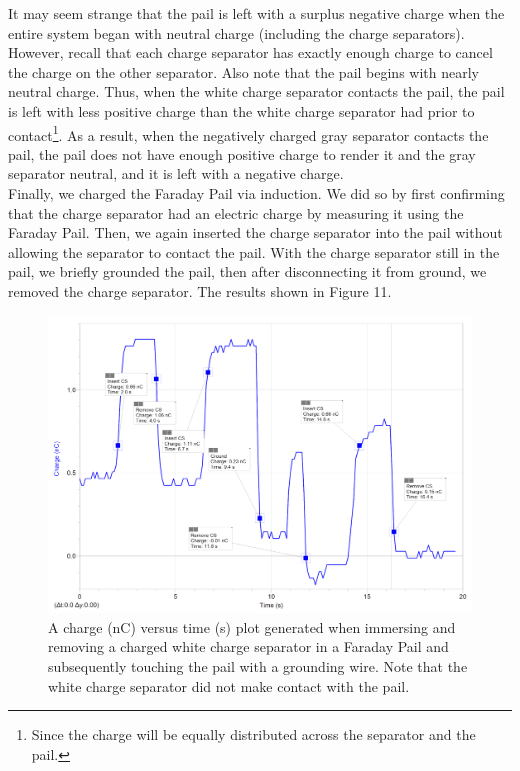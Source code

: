 \documentclass[oneside,12pt]{amsart}
\begin{document}
\indent It may seem strange that the pail is left with a surplus negative charge when the entire system began with neutral charge (including the charge separators). However, recall that each charge separator has exactly enough charge to cancel the charge on the other separator. Also note that the pail begins with nearly neutral charge. Thus, when the white charge separator contacts the pail, the pail is left with less positive charge than the white charge separator had prior to contact\footnote{Since the charge will be equally distributed across the separator and the pail.}. As a result, when the negatively charged gray separator contacts the pail, the pail does not have enough positive charge to render it and the gray separator neutral, and it is left with a negative charge.\\

\indent Finally, we charged the Faraday Pail via induction. We did so by first confirming that the charge separator had an electric charge by measuring it using the Faraday Pail. Then, we again inserted the charge separator into the pail without allowing the separator to contact the pail. With the charge separator still in the pail, we briefly grounded the pail, then after disconnecting it from ground, we removed the charge separator. The results shown in Figure 11.
\begin{figure}[h]
	\includegraphics[width=\medgraph,scale=0.01]{SeparatorInduction.png}
	\caption{A charge (nC) versus time (s) plot generated when immersing and removing a charged white charge separator in a Faraday Pail and subsequently touching the pail with a grounding wire. Note that the white charge separator did not make contact with the pail.}
	\label{Induction}
\end{figure} 
\end{document}
